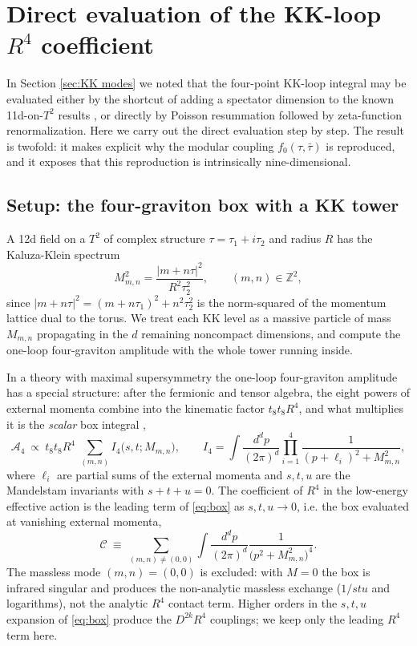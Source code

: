 \section{Direct evaluation of the KK-loop $R^4$ coefficient}
\label{sec:KK loop R4}
In Section \ref{sec:KK modes} we noted that the four-point KK-loop integral may be evaluated either by the shortcut of adding a spectator dimension to the known 11d-on-$T^2$ results \cite{Green:1997as}, or directly by Poisson resummation followed by zeta-function renormalization.
Here we carry out the direct evaluation step by step.
The result is twofold: it makes explicit why the modular coupling $f_0(\tau,\bar\tau)$ is reproduced, and it exposes that this reproduction is intrinsically nine-dimensional.

\subsection*{Setup: the four-graviton box with a KK tower}
A 12d field on a $T^2$ of complex structure $\tau=\tau_1+i\tau_2$ and radius $R$ has the Kaluza-Klein spectrum
\begin{equation}
M_{m,n}^2=\frac{|m+n\tau|^2}{R^2\tau_2^2},\qquad (m,n)\in\mathbb{Z}^2,
\label{eq:KK-spectrum}
\end{equation}
since $|m+n\tau|^2=(m+n\tau_1)^2+n^2\tau_2^2$ is the norm-squared of the momentum lattice dual to the torus.
We treat each KK level as a massive particle of mass $M_{m,n}$ propagating in the $d$ remaining noncompact dimensions, and compute the one-loop four-graviton amplitude with the whole tower running inside.

In a theory with maximal supersymmetry the one-loop four-graviton amplitude has a special structure: after the fermionic and tensor algebra, the eight powers of external momenta combine into the kinematic factor $t_8t_8R^4$, and what multiplies it is the \emph{scalar} box integral \cite{Green:1997as,Green:1999pv},
\begin{equation}
\mathcal{A}_4\ \propto\ t_8t_8R^4\;\sum_{(m,n)} I_4\big(s,t;M_{m,n}\big),\qquad
I_4=\int\frac{d^dp}{(2\pi)^d}\prod_{i=1}^{4}\frac{1}{(p+\ell_i)^2+M_{m,n}^2},
\label{eq:box}
\end{equation}
where $\ell_i$ are partial sums of the external momenta and $s,t,u$ are the Mandelstam invariants with $s+t+u=0$.
The coefficient of $R^4$ in the low-energy effective action is the leading term of \eqref{eq:box} as $s,t,u\to0$, i.e. the box evaluated at vanishing external momenta,
\begin{equation}
\mathcal{C}\ \equiv\ \sum_{(m,n)\neq(0,0)}\int\frac{d^dp}{(2\pi)^d}\frac{1}{\big(p^2+M_{m,n}^2\big)^{4}} .
\label{eq:coeff-momentum}
\end{equation}
The massless mode $(m,n)=(0,0)$ is excluded: with $M=0$ the box is infrared singular and produces the non-analytic massless exchange ($1/stu$ and logarithms), not the analytic $R^4$ contact term.
Higher orders in the $s,t,u$ expansion of \eqref{eq:box} produce the $D^{2k}R^4$ couplings; we keep only the leading $R^4$ term here.

